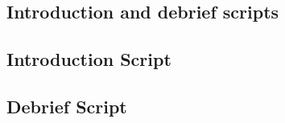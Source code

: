 \documentclass{l4proj}
\begin{document}
\begin{appendices}

\chapter{Introduction and debrief scripts}

\section{Introduction Script}
\section{Debrief Script}

\end{appendices}






\end{document}
